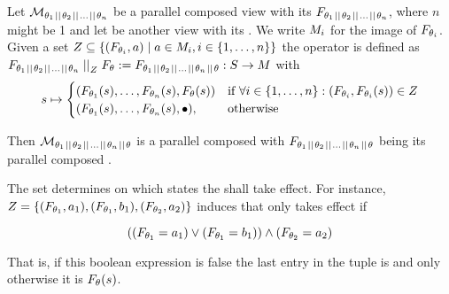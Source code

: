 \documentclass[preview]{standalone}
\begin{document}
\begin{definition}
	Let $\view[\viewppty_1 \pll \viewppty_2 \pll \dots \pll 
	\viewppty_n]$ be a parallel composed view with its \grpfctN $\grpfct[{\viewppty_1 \pll \viewppty_2 \pll \dots \pll \viewppty_n}]$, where $n$ might be 1 and let \view be another view with its \grpfctN \grpfct. 
	We write $\imggrp_i$ for the image of $\grpfct[\viewppty_i]$. 
	Given a set $\compselectset \subseteq \{ (\grpfct[\viewppty_i], a) \mid a \in \imggrp_i, i \in \{1, \dots, n\}\}$ the operator \compselectpure is defined as $\grpfct[{\viewppty_1 \pll \viewppty_2 \pll \dots \pll \viewppty_n}] \compselect \grpfct := \grpfct[{\viewppty_1 \pll \viewppty_2 \pll \dots \pll \viewppty_n} \pll \viewppty]: \states \to \arbset$ with
	\[
	\state \mapsto
	\begin{cases}
		(\grpfct[\viewppty_1](\state), \dots, \grpfct[\viewppty_n](\state),  \grpfct[\viewppty](\state))				& \text{if } \forall i \in \{1, \dots, n\} : (\grpfct[\viewppty_i], \grpfct[\viewppty_i](\state)) \in \compselectset \\ 		
		(\grpfct[\viewppty_1](\state), \dots, \grpfct[\viewppty_n](\state),  \remelem),          	& \text{otherwise}
	\end{cases}
	\]
	
	\noindent
	Then $\view[\viewppty_1 \pll \viewppty_2 \pll \dots \pll 
	\viewppty_n \pll \viewppty]$ is a parallel composed \viewN with $\grpfct[{\viewppty_1 \pll \viewppty_2 \pll \dots \pll \viewppty_n} \pll \viewppty]$ being its parallel composed \grpfctN.
	\label{def:compositionselective}
\end{definition}

The set \compselectset determines on which states the \viewN \view shall take effect. For instance, $\compselectset = \{(\grpfct[\viewppty_1], a_1),(\grpfct[\viewppty_1], b_1), (\grpfct[\viewppty_2], a_2)\}$ induces that \view only takes effect if 

\[
	((\grpfct[\viewppty_1] = a_1) \lor (\grpfct[\viewppty_1] = b_1)) \land (\grpfct[\viewppty_2] = a_2)
\]

That is, if this boolean expression is false the last entry in the tuple is \remelem and only otherwise it is $\grpfct(\state)$.
\end{document}
